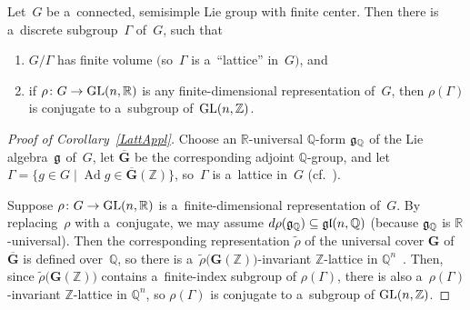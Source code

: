 \begin{cor}
\label{LattAppl}
Let~$G$ be a~connected, semisimple Lie group with finite center.
Then there is a~discrete subgroup~$\Gamma$ of~$G$, such that
\renewcommand{\labelenumi}{{\rm (\theenumi)}}
\begin{enumerate}\itemsep=0pt
\item $G/\Gamma$ has finite volume $($so~$\Gamma$ is a~``lattice'' in~$G)$, and
\item if $\rho \colon G \to \operatorname{GL}(n,\mathbb{R})$ is any finite-dimensional representation of~$G$, then $\rho(\Gamma)$ is
conjugate to a~subgroup of~$\operatorname{GL}(n,\mathbb{Z})$.
\end{enumerate}
\end{cor}

\begin{proof}[Proof of Corollary~\ref{LattAppl}] Choose an $\mathbb{R}$-universal $\mathbb{Q}$-form $\Lie G_\mathbb{Q}$ of the Lie
algebra~$\Lie G$ of~$G$, let $\overline{\mathbf{G}}$ be the corresponding adjoint $\mathbb{Q}$-group, and let $\Gamma = \{
g \in G \mid \mathop{\mathrm{Ad}} g \in \overline{\mathbf{G}}(\mathbb{Z}) \}$, so~$\Gamma$ is a~lattice in~$G$
(cf.~\cite[Theorem~4.14, p.~220]{PlatonovRapinchukBook}).

Suppose $\rho \colon G \to \operatorname{GL}(n,\mathbb{R})$ is a~f\/inite-dimensional representation of~$G$.
By replacing~$\rho$ with a~conjugate, we may assume $d\rho(\Lie G_\mathbb{Q}) \subseteq \Lie{GL}(n,\mathbb{Q})$ (because
$\Lie G_\mathbb{Q}$ is $\mathbb{R}$-universal).
Then the corresponding representation $\widetilde\rho$ of the universal cover $\mathbf{G}$ of~$\overline{\mathbf{G}}$ is
def\/ined over~$\mathbb{Q}$, so there is a~$\widetilde\rho \bigl(\mathbf{G}(\mathbb{Z}) \bigr)$-invariant
$\mathbb{Z}$-lattice in $\mathbb{Q}^n$~\cite[Remark on p.~173]{PlatonovRapinchukBook}.
Then, since $\widetilde\rho \bigl(\mathbf{G}(\mathbb{Z}) \bigr)$ contains a~f\/inite-index subgroup of $\rho(\Gamma)$,
there is also a~$\rho(\Gamma)$-invariant $\mathbb{Z}$-lattice in $\mathbb{Q}^n$, so $\rho(\Gamma)$ is conjugate to
a~subgroup of $\operatorname{GL}(n,\mathbb{Z})$.
\end{proof}

